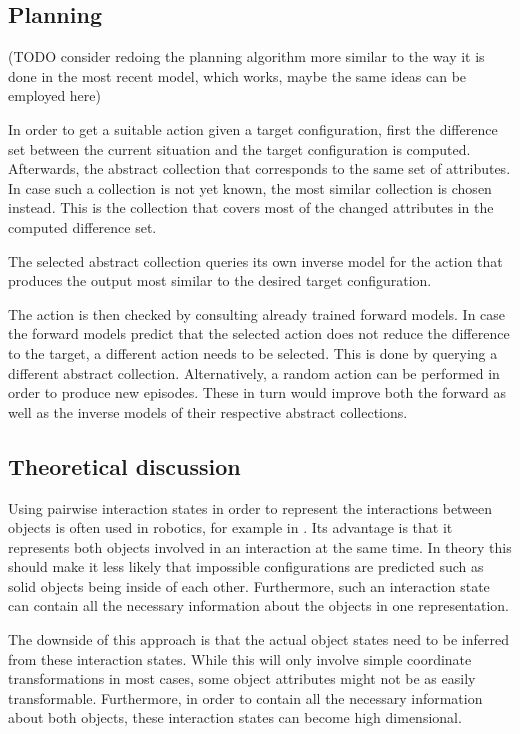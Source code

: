 \subsection{Planning}

(TODO consider redoing the planning algorithm more similar to the way it is done
in the most recent model, which works, maybe the same ideas can be employed 
here)

In order to get a suitable action given a target configuration, first the 
difference set between the current situation and the target 
configuration is computed. Afterwards, the abstract collection that corresponds to the same set of attributes. In case such a collection is not yet known, the 
most similar collection is chosen instead. This is the collection that covers 
most of the changed attributes in the computed difference set. 

The selected abstract collection queries its own inverse model for the 
action that produces the output most similar to the desired target configuration. 

The action is then checked by consulting already trained forward models. In case the forward models predict that the selected action does not reduce the difference to the target, a different action needs to be selected. This is done by querying a different abstract collection. Alternatively, a random action can be performed in order to produce new episodes. These in turn would improve both the forward as well as the inverse models of their respective abstract collections.

\subsection{Theoretical discussion}
Using pairwise interaction states in order to represent the interactions between objects is often used in robotics, for example in \cite{pairwiseExamples}. Its advantage is that it represents both objects involved in an interaction at the same time. In theory this should make it less likely that impossible configurations are predicted such as solid objects being inside of each other. Furthermore, such an interaction state can contain all the necessary information about the objects in one representation. 

The downside of this approach is that the actual object states need to be inferred from these interaction states. While this will only involve simple coordinate transformations in most cases, some object attributes might not be as easily transformable. Furthermore, in order to contain all the necessary information about both objects, these interaction states can become high dimensional. 

